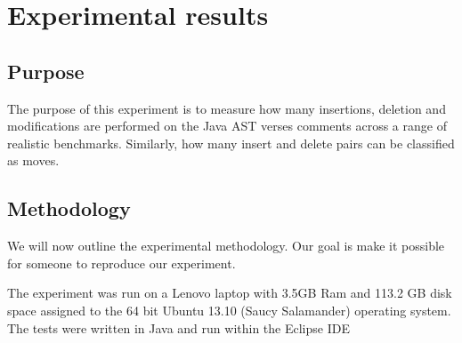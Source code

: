 
\chapter{Experimental results}

\section{Purpose}
The purpose of this experiment is to measure how many insertions, deletion and modifications are performed on the Java AST verses comments across a range of realistic benchmarks. Similarly, how many insert and delete pairs can be classified as moves.


\section{Methodology}
We will now outline the experimental methodology. Our goal is make it possible for someone to reproduce our experiment.

The experiment was run on a Lenovo laptop with 3.5GB Ram and 113.2 GB disk space assigned to the 64 bit Ubuntu 13.10 (Saucy Salamander) operating system. The tests were written in Java and run within the Eclipse IDE



